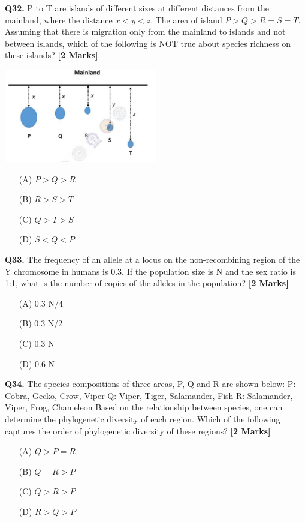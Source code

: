 \documentclass[11pt]{article}
\newcommand{\questionb}[2]{
    \noindent\textbf{Q#2.} #1 \hfill \textbf{[2 Marks]}
}
\begin{document}
\questionb{P to T are islands of different sizes at different distances from the mainland, where the distance $x < y < z$. The area of island $P > Q > R = S = T$. Assuming that there is migration only from the mainland to islands and not between islands, which of the following is NOT true about species richness on these islands?}{32}
\begin{center}
\includegraphics[width=0.5\textwidth]{figures/32.png}
\end{center}
\begin{enumerate}
    \item[(A)] $P > Q > R$  
    \item[(B)] $R > S > T$  
    \item[(C)] $Q > T > S$  
    \item[(D)] $S < Q < P$  
\end{enumerate}
\vspace{0.5cm}

\questionb{The frequency of an allele at a locus on the non-recombining region of the Y chromosome in humans is 0.3. If the population size is N and the sex ratio is 1:1, what is the number of copies of the alleles in the population?}{33}
\begin{enumerate}
    \item[(A)] 0.3 N/4  
    \item[(B)] 0.3 N/2  
    \item[(C)] 0.3 N  
    \item[(D)] 0.6 N  
\end{enumerate}
\vspace{0.5cm}

\questionb{The species compositions of three areas, P, Q and R are shown below: \newline
P: Cobra, Gecko, Crow, Viper \newline
Q: Viper, Tiger, Salamander, Fish \newline
R: Salamander, Viper, Frog, Chameleon \newline
Based on the relationship between species, one can determine the phylogenetic diversity of each region. Which of the following captures the order of phylogenetic diversity of these regions?}{34}
\begin{enumerate}
    \item[(A)] $Q > P = R$  
    \item[(B)] $Q = R > P$  
    \item[(C)] $Q > R > P$  
    \item[(D)] $R > Q > P$  
\end{enumerate}
\vspace{0.5cm}
\end{document}
